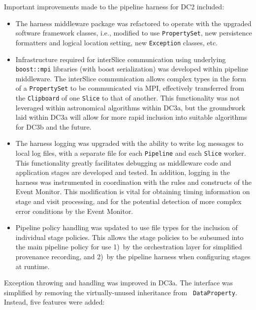 Important improvements made to the pipeline harness for DC2 included:
\begin{itemize}
\item The harness middleware package was refactored to operate with the upgraded
software framework classes, i.e., modified to use {\tt PropertySet},
new persistence formatters and logical location setting, new {\tt Exception} classes, etc.
\item Infrastructure required for interSlice communication using underlying {\tt boost::mpi}
libraries (with boost serialization) was developed within pipeline middleware.
The interSlice communication allows complex types in the form of a {\tt PropertySet} to be
communicated via MPI, effectively transferred from the {\tt Clipboard} of
one {\tt Slice} to that of another.
This functionality was not leveraged within astronomical algorithms within DC3a, but
the groundwork laid within DC3a will allow for more rapid inclusion into suitable
algorithms for DC3b and the future.

\item The harness logging was upgraded with the ability to write log messages to
local log files, with a separate file for each {\tt Pipeline}
and each {\tt Slice} worker.
This functionality greatly facilitates debugging as middleware code and application
stages are developed and tested.  In addition, logging in the harness
was instrumented in coordination with the rules and constructs of the Event Monitor.
This modification is vital for obtaining timing information on stage and visit processing,
and for the potential detection of more complex error conditions by the Event Monitor.
\item Pipeline policy handling was updated to use file types for the inclusion of 
individual stage policies. This allows the stage policies to be subsumed into 
the main pipeline policy for use 1)~by the orchestration layer for 
simplified provenance recording, and 2)~by the pipeline harness when configuring stages 
at runtime.  
\end{itemize}



Exception throwing and handling was improved in DC3a. The interface was
simplified by removing the virtually-unused inheritance from {\tt
DataProperty}.  Instead, five features were added:

